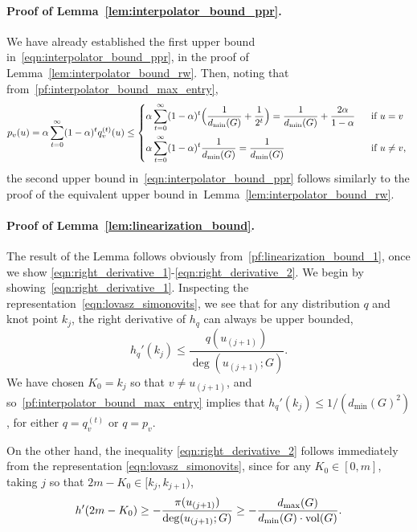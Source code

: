 \paragraph{Proof of Lemma~\ref{lem:interpolator_bound_ppr}.}
	We have already established the first upper bound in~\eqref{eqn:interpolator_bound_ppr}, in the proof of Lemma~\ref{lem:interpolator_bound_rw}. Then, noting that from~\eqref{pf:interpolator_bound_max_entry}, 
	\begin{equation}
	\label{eqn:ppr_max_entry}
	p_v(u) = \alpha \sum_{t = 0}^{\infty} (1 - \alpha)^t q_v^{(t)}(u) \leq
	\begin{dcases*}
	\alpha \sum_{t = 0}^{\infty} (1 - \alpha)^t \Bigl(\frac{1}{d_{\min}(G)} + \frac{1}{2^t}\Bigr) = \frac{1}{d_{\min}(G)} + \frac{2\alpha}{1 - \alpha}& ~~\textrm{if $u = v$} \\
	\alpha \sum_{t = 0}^{\infty} (1 - \alpha)^t \frac{1}{d_{\min}(G)} = \frac{1}{d_{\min}(G)} & ~~\textrm{if $u \neq v$,}
	\end{dcases*}
	\end{equation}
	the second upper bound in~\eqref{eqn:interpolator_bound_ppr} follows similarly to the proof of the equivalent upper bound in~Lemma~\ref{lem:interpolator_bound_rw}.

\paragraph{Proof of Lemma~\ref{lem:linearization_bound}.}
	The result of the Lemma follows obviously from~\eqref{pf:linearization_bound_1}, once we show \eqref{eqn:right_derivative_1}-\eqref{eqn:right_derivative_2}. We begin by showing~\eqref{eqn:right_derivative_1}. Inspecting the representation~\eqref{eqn:lovasz_simonovits}, we see that for any distribution $q$ and knot point $k_j$, the right derivative of $h_q$ can always be upper bounded,
	\begin{equation*}
	h_{q}'(k_j) \leq \frac{q(u_{(j + 1)})}{\deg(u_{(j + 1)};G)}.
	\end{equation*}
	We have chosen $K_0 = k_j$ so that $v \neq u_{(j + 1)}$, and so~\eqref{pf:interpolator_bound_max_entry} implies that $h_{q}'(k_j) \leq 1/(d_{\min}(G)^2)$, for either $q = q_v^{(t)}$ or $q = p_v$.
	
	On the other hand, the inequality \eqref{eqn:right_derivative_2} follows immediately from the representation \eqref{eqn:lovasz_simonovits}, since for any $K_0 \in [0,m]$, taking $j$ so that $2m - K_0 \in [k_j, k_{j + 1})$, 
	\begin{equation*}
	h'(2m - K_0) \geq -\frac{\pi(u_{(j+1)})}{\mathrm{deg}(u_{(j + 1)};G)} \geq -\frac{d_{\max}(G)}{d_{\min}(G) \cdot \mathrm{vol}(G)}.
	\end{equation*}
	
